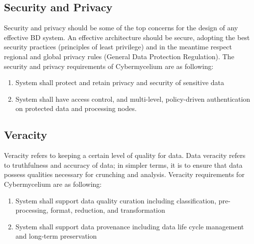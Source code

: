 \documentclass[review]{elsarticle}
\begin{document}
\subsection{Security and Privacy}

Security and privacy should be some of the top concerns for the design of any effective BD system. An effective architecture should be secure, adopting the best security practices (principles of least privilege) and in the meantime respect regional and global privacy rules (General Data Protection Regulation). The security and privacy requirements of Cybermycelium are as following:

\begin{enumerate}[label=\textbf{SaP-\arabic*}]
    \item System shall protect and retain privacy and security of sensitive data
    \item System shall have access control, and multi-level, policy-driven authentication on protected data and processing nodes.
\end{enumerate}

\subsection{Veracity}

Veracity refers to keeping a certain level of quality for data. Data veracity refers to truthfulness and accuracy of data; in simpler terms, it is to ensure that data possess qualities necessary for crunching and analysis. Veracity requirements for Cybermycelium are as following: 

\begin{enumerate}[label=\textbf{Ver-\arabic*}]
    \item System shall support data quality curation including classification, pre-processing, format, reduction, and transformation
    \item System shall support data provenance including data life cycle management and long-term preservation
\end{enumerate}




        
\end{document}

